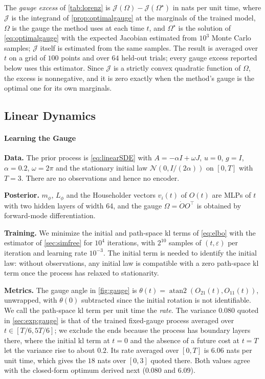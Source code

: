 \documentclass{article} %
\newcommand{\vol}{g}
\newcommand{\gauge}{\Omega}
\newcommand{\Norm}{\mathcal{N}}
\begin{document}
The \emph{gauge excess} of \cref{tab:lorenz} is $\mathcal{J}(\gauge) - \mathcal{J}(\gauge^\star)$ in nats per unit time, where $\mathcal{J}$ is the integrand of \cref{prop:optimalgauge} at the marginals of the trained model, $\gauge$ is the gauge the method uses at each time $t$, and $\gauge^\star$ is the solution of \cref{eq:optimalgauge} with the expected Jacobian estimated from $10^3$ Monte Carlo samples; $\mathcal{J}$ itself is estimated from the same samples. The result is averaged over $t$ on a grid of $100$ points and over $64$ held-out trials; every gauge excess reported below uses this estimator. Since $\mathcal{J}$ is a strictly convex quadratic function of $\gauge$, the excess is nonnegative, and it is zero exactly when the method's gauge is the optimal one for its own marginals.

\subsection{Linear Dynamics}
\label{sec:expdetails:linear}

\paragraph{Learning the Gauge}
\textbf{Data.} The prior process is \cref{eq:linearSDE} with $A = -\alpha I + \omega J$, $u = 0$, $\vol = I$, $\alpha = 0.2$, $\omega = 2 \pi$ and the stationary initial law $\Norm(0, I / (2 \alpha))$ on $[0, T]$ with $T = 3$. There are no observations and hence no encoder.

\textbf{Posterior.} $m_\phi$, $L_\phi$ and the Householder vectors $v_i(t)$ of $O(t)$ are MLPs of $t$ with two hidden layers of width 64, and the gauge $\gauge = \dot O O^\top$ is obtained by forward-mode differentiation.

\textbf{Training.} We minimize the initial and path-space \gls{kl} terms of \cref{eq:elbo} with the estimator of \cref{sec:simfree} for $10^4$ iterations, with $2^{10}$ samples of $(t, \varepsilon)$ per iteration and learning rate $10^{-3}$. The initial term is needed to identify the initial law: without observations, any initial law is compatible with a zero path-space \gls{kl} term once the process has relaxed to stationarity.

\textbf{Metrics.} The gauge angle in \cref{fig:gauge} is $\theta(t) = \operatorname{atan2}(O_{21}(t), O_{11}(t))$, unwrapped, with $\theta(0)$ subtracted since the initial rotation is not identifiable. We call the path-space \gls{kl} term per unit time the \emph{rate}. The variance $0.080$ quoted in \cref{sec:exp:gauge} is that of the trained fixed-gauge process averaged over $t \in [T/6, 5T/6]$; we exclude the ends because the process has boundary layers there, where the initial \gls{kl} term at $t = 0$ and the absence of a future cost at $t = T$ let the variance rise to about $0.2$. Its rate averaged over $[0, T]$ is $6.06$ nats per unit time, which gives the $18$ nats over $[0, 3]$ quoted there. Both values agree with the closed-form optimum derived next ($0.080$ and $6.09$).
\end{document}

